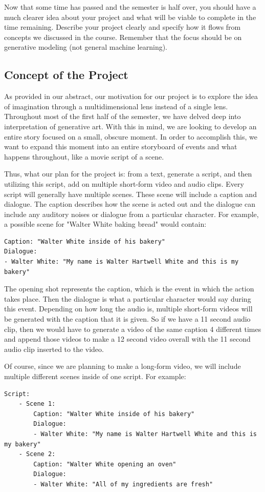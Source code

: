 \documentclass[conference]{IEEEtran}
\begin{document}
\begin{tcolorbox}
Now that some time has passed and the semester is half over, you should have a much clearer idea about your project and what will be viable to complete in the time remaining. Describe your project clearly and specify how it flows from concepts we discussed in the course. Remember that the focus should be on generative modeling (not general machine learning).
\end{tcolorbox}

\subsection{Concept of the Project}

As provided in our abstract, our motivation for our project is to explore the idea of imagination through a multidimensional lens instead of a single lens. Throughout most of the first half of the semester, we have delved deep into interpretation of generative art. With this in mind, we are looking to develop an entire story focused on a small, obscure moment. In order to accomplish this, we want to expand this moment into an entire storyboard of events and what happens throughout, like a movie script of a scene. 

Thus, what our plan for the project is: from a text, generate a script, and then utilizing this script, add on multiple short-form video and audio clips. Every script will generally have multiple scenes. These scene will include a caption and dialogue. The caption describes how the scene is acted out and the dialogue can include any auditory noises or dialogue from a particular character. For example, a possible scene for "Walter White baking bread" would contain:
\begin{lstlisting}
Caption: "Walter White inside of his bakery"
Dialogue: 
- Walter White: "My name is Walter Hartwell White and this is my bakery"
\end{lstlisting}
The opening shot represents the caption, which is the event in which the action takes place. Then the dialogue is what a particular character would say during this event. Depending on how long the audio is, multiple short-form videos will be generated with the caption that it is given. So if we have a 11 second audio clip, then we would have to generate a video of the same caption 4 different times and append those videos to make a 12 second video overall with the 11 second audio clip inserted to the video.

Of course, since we are planning to make a long-form video, we will include multiple different scenes inside of one script. For example:
\begin{lstlisting}
Script:
    - Scene 1:
        Caption: "Walter White inside of his bakery"
        Dialogue: 
        - Walter White: "My name is Walter Hartwell White and this is my bakery"
    - Scene 2:
        Caption: "Walter White opening an oven"
        Dialogue: 
        - Walter White: "All of my ingredients are fresh"
\end{lstlisting}
\end{document}
